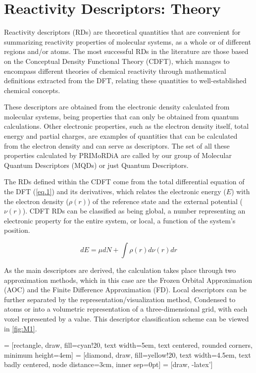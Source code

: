 \documentclass[a4paper,11pt]{refart}
\begin{document}
	\section{Reactivity Descriptors: Theory}

	Reactivity descriptors (RDs) are theoretical quantities that are convenient for summarizing reactivity properties of molecular systems, as a whole or of different regions and/or atoms. The most successful RDs in the literature are those based on the Conceptual Density Functional Theory (CDFT), which manages to encompass different theories of chemical reactivity through mathematical definitions extracted from the DFT, relating these quantities to well-established chemical concepts\cite{geerlings2003conceptual}.

	These descriptors are obtained from the electronic density calculated from molecular systems, being properties that can only be obtained from quantum calculations. Other electronic properties, such as the electron density itself, total energy and partial charges, are examples of quantities that can be calculated from the electron density and can serve as descriptors. The set of all these properties calculated by PRIMoRDiA are called by our group of Molecular Quantum Descriptors (MQDs) or just Quantum Descriptors.

	The RDs defined within the CDFT come from the total differential equation of the DFT (\autoref{eq.1}) and its derivatives\cite{parr1978elect}, which relates the electronic energy ($E$) with the electron density ($\rho( r)$) of the reference state and the external potential ($\nu(r)$). CDFT RDs can be classified as being global, a number representing an electronic property for the entire system, or local, a function of the system's position.

	\begin{equation}
	dE = \mu dN + \int \rho(r) d \nu (r) dr
	\label{eq.1}
	\end{equation}

	As the main descriptors are derived, the calculation takes place through two approximation methods, which in this case are the Frozen Orbital Approximation (AOC) and the Finite Difference Approximation (FD). Local descriptors can be further separated by the representation/visualization method, Condensed to atoms or into a volumetric representation of a three-dimensional grid, with each voxel represented by a value. This descriptor classification scheme can be viewed in \autoref{fig:M1}.

	 = [rectangle, draw, fill=cyan!20, 
	text width=5em, text centered, rounded corners, minimum height=4em]
	 = [diamond, draw, fill=yellow!20, 
	text width=4.5em, text badly centered, node distance=3cm, inner sep=0pt]
	 = [draw, -latex']
\end{document}
